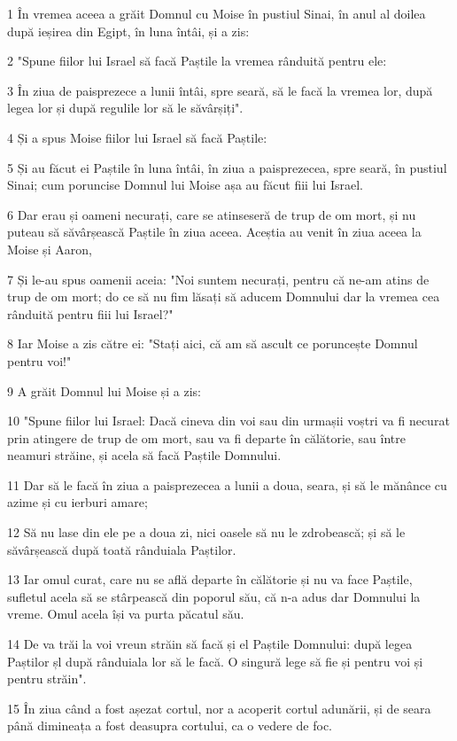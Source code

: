 \par 1 În vremea aceea a grăit Domnul cu Moise în pustiul Sinai, în anul al doilea după ieșirea din Egipt, în luna întâi, și a zis:
\par 2 "Spune fiilor lui Israel să facă Paștile la vremea rânduită pentru ele:
\par 3 În ziua de paisprezece a lunii întâi, spre seară, să le facă la vremea lor, după legea lor și după regulile lor să le săvârșiți".
\par 4 Și a spus Moise fiilor lui Israel să facă Paștile:
\par 5 Și au făcut ei Paștile în luna întâi, în ziua a paisprezecea, spre seară, în pustiul Sinai; cum poruncise Domnul lui Moise așa au făcut fiii lui Israel.
\par 6 Dar erau și oameni necurați, care se atinseseră de trup de om mort, și nu puteau să săvârșească Paștile în ziua aceea. Aceștia au venit în ziua aceea la Moise și Aaron,
\par 7 Și le-au spus oamenii aceia: "Noi suntem necurați, pentru că ne-am atins de trup de om mort; do ce să nu fim lăsați să aducem Domnului dar la vremea cea rânduită pentru fiii lui Israel?"
\par 8 Iar Moise a zis către ei: "Stați aici, că am să ascult ce poruncește Domnul pentru voi!"
\par 9 A grăit Domnul lui Moise și a zis:
\par 10 "Spune fiilor lui Israel: Dacă cineva din voi sau din urmașii voștri va fi necurat prin atingere de trup de om mort, sau va fi departe în călătorie, sau între neamuri străine, și acela să facă Paștile Domnului.
\par 11 Dar să le facă în ziua a paisprezecea a lunii a doua, seara, și să le mănânce cu azime și cu ierburi amare;
\par 12 Să nu lase din ele pe a doua zi, nici oasele să nu le zdrobească; și să le săvârșească după toată rânduiala Paștilor.
\par 13 Iar omul curat, care nu se află departe în călătorie și nu va face Paștile, sufletul acela să se stârpească din poporul său, că n-a adus dar Domnului la vreme. Omul acela își va purta păcatul său.
\par 14 De va trăi la voi vreun străin să facă și el Paștile Domnului: după legea Paștilor șl după rânduiala lor să le facă. O singură lege să fie și pentru voi și pentru străin".
\par 15 În ziua când a fost așezat cortul, nor a acoperit cortul adunării, și de seara până dimineața a fost deasupra cortului, ca o vedere de foc.
